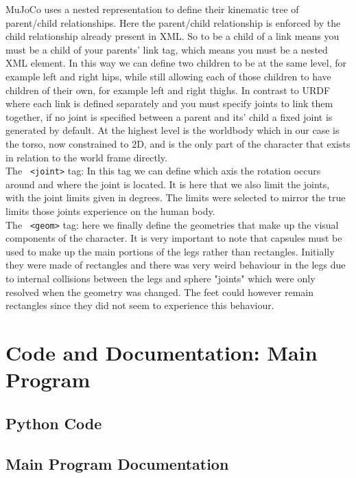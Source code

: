 \documentclass[12pt, a4paper]{article}
\begin{document}
MuJoCo uses a nested representation to define their kinematic tree of parent/child relationships. Here the parent/child relationship is enforced by the child relationship already present in XML. So to be a child of a link means you must be a child of your parents' link tag, which means you must be a nested XML element. In this way we can define two children to be at the same level, for example left and right hips, while still allowing each of those children to have children of their own, for example left and right thighs. In contrast to URDF where each link is defined separately and you must specify joints to link them together, if no joint is specified between a parent and its' child a fixed joint is generated by default.  At the highest level is the worldbody which in our case is the torso, now constrained to 2D, and is the only part of the character that exists in relation to the world frame directly.\\

The \verb; <joint>; tag: In this tag we can define which axis the rotation occurs around and where the joint is located. It is here that we also limit the joints, with the joint limits given in degrees. The limits were selected to mirror the true limits those joints experience on the human body. \\

The \verb; <geom>; tag: here we finally define the geometries that make up the visual components of the character. It is very important to note that capsules must be used to make up the main portions of the legs rather than rectangles. Initially they were made of rectangles and there was very weird behaviour in the legs due to internal collisions between the legs and sphere "joints" which were only resolved when the geometry was changed. The feet could however remain rectangles since they did not seem to experience this behaviour.\\ 




\section{Code and Documentation: Main Program}
\label{apdx: main program}
\subsection{Python Code}


\subsection{Main Program Documentation}
\end{document}
